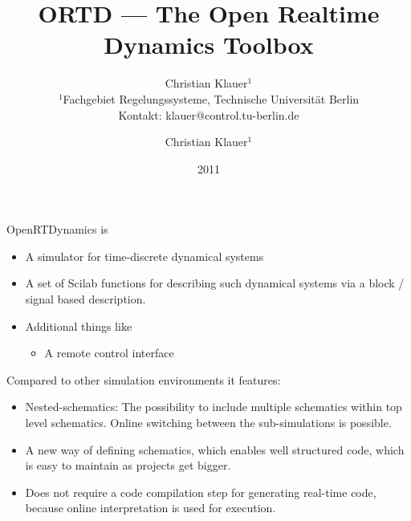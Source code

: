 \documentclass[serif,9pt,xcolor=dvipsnames]{beamer}
\title[]{ORTD --- The Open Realtime Dynamics Toolbox}
\subtitle{} %
\date{2011}
\author{Christian Klauer$^{1}$\\
{\tiny $^{1}$Fachgebiet Regelungssysteme, Technische Universität Berlin\\
Kontakt: klauer@control.tu-berlin.de}
}
\begin{document}

\author{Christian Klauer$^{1}$}



\begin{frame}
  \maketitle
\end{frame}


\begin{frame}

OpenRTDynamics is

 \begin{itemize}
  \item A simulator for time-discrete dynamical systems
  \item A set of Scilab functions for describing such dynamical systems via a block / signal based description.
  \item Additional things like
  \begin{itemize}
    \item A remote control interface
   \end{itemize}
 \end{itemize}

Compared to other simulation environments it features:
\begin{itemize}
 \item Nested-schematics: The possibility to include multiple schematics within top level schematics. Online switching between the sub-simulations is possible.
 \item A new way of defining schematics, which enables well structured code, which is easy to maintain as projects get bigger.
\item Does not require a code compilation step for generating real-time code, because online interpretation is used for execution.
\end{itemize}


\end{frame}
\end{document}
